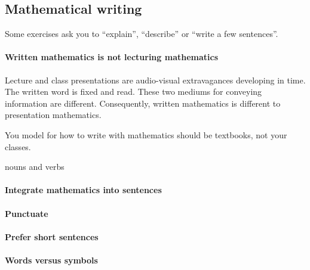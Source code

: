 \begin{draft}
\section{Mathematical writing}
\label{sec:write}

\secttoc

\begin{comment}
\cite{Higham98} Chapters 3 and~4: dos and don'ts; etc.
\cite{Zobel04}
\end{comment}

Some exercises ask you to ``explain'', ``describe'' or ``write a few sentences''.

\paragraph{Written mathematics is not lecturing mathematics}
Lecture and class presentations are audio-visual extravagances developing in time.
The written word is fixed and read.
These two mediums for conveying information are different.
Consequently, written mathematics is different to presentation mathematics.

You model for how to write with mathematics should be textbooks, not your classes.



nouns and verbs



\paragraph{Integrate mathematics into sentences}



\paragraph{Punctuate}



\paragraph{Prefer short sentences}



\paragraph{Words versus symbols}




\end{draft}
